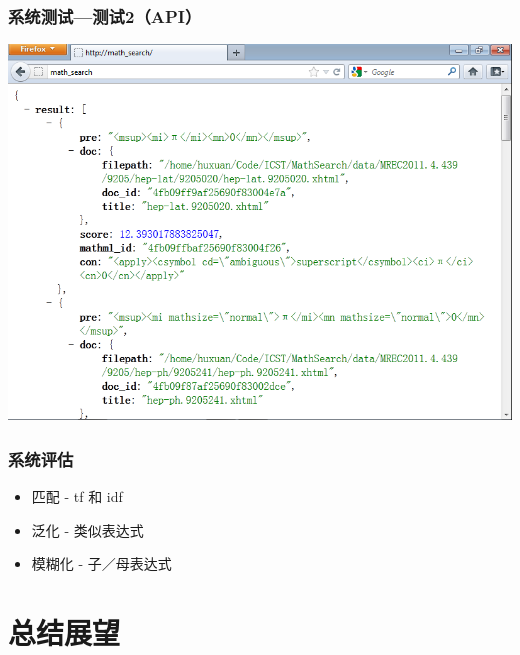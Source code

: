\documentclass[17pt]{beamer}
\begin{document}
    \begin{frame}
        \frametitle{系统测试---测试2（API）}
        \begin{center}
            \includegraphics[width=.7\paperwidth]{pic/test2_api.png}
        \end{center}
    \end{frame}

    \begin{frame}
        \frametitle{系统评估}
        \begin{itemize}
            \item 匹配 - tf 和 idf
            \item 泛化 - 类似表达式
            \item 模糊化 - 子／母表达式
        \end{itemize}
    \end{frame}
    
    \section{总结展望}
    
\end{document}
